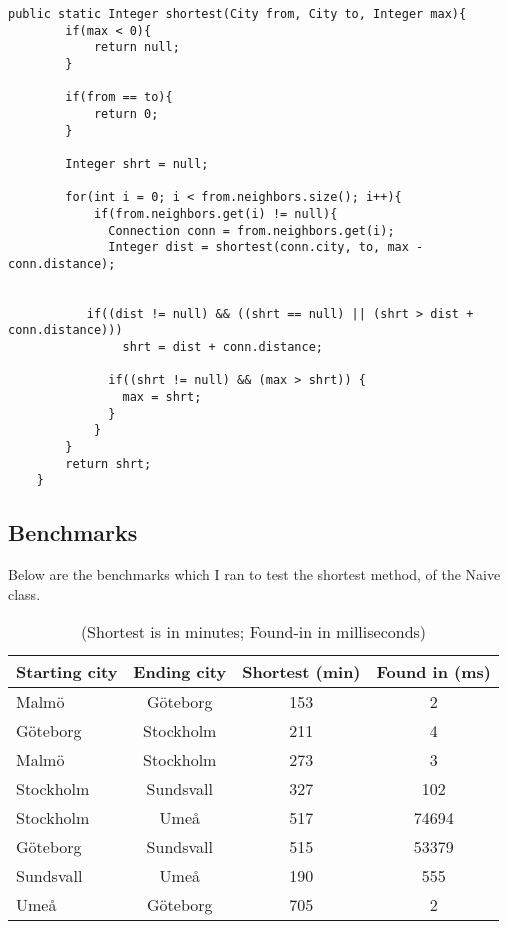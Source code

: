 \documentclass[a4paper,11pt]{article}
\begin{document}
\begin{verbatim}
public static Integer shortest(City from, City to, Integer max){
        if(max < 0){
            return null;
        }
        
        if(from == to){
            return 0;
        }

        Integer shrt = null;

        for(int i = 0; i < from.neighbors.size(); i++){
            if(from.neighbors.get(i) != null){
              Connection conn = from.neighbors.get(i);
              Integer dist = shortest(conn.city, to, max - conn.distance);
              

           if((dist != null) && ((shrt == null) || (shrt > dist + conn.distance)))
                shrt = dist + conn.distance;
               
              if((shrt != null) && (max > shrt)) {
                max = shrt;
              }
            }
        }
        return shrt;
    }
\end{verbatim}

\subsection*{Benchmarks}
Below are the benchmarks which I ran to test the shortest method, of the Naive class.

\begin{table}[h]
\begin{center}
\begin{tabular}{l|c|c|c}
\textbf{Starting city} & \textbf{Ending city} & \textbf{Shortest (min)} & \textbf{Found in (ms)}\\
\hline
  Malmö      &  Göteborg     &  153     &  2\\
  Göteborg      &  Stockholm     &  211     &  4\\
  Malmö      &  Stockholm     &  273     &  3\\
  Stockholm      &  Sundsvall     &  327     &  102\\
  Stockholm      &  Umeå     &  517     &  74694\\
  Göteborg      &  Sundsvall     &  515     &  53379\\
  Sundsvall      &  Umeå     &  190     &  555\\
  Umeå      &  Göteborg     &  705     &  2\\
\end{tabular}
\caption{(Shortest is in minutes; Found-in in milliseconds)}
\label{tab:table1}
\end{center}
\end{table}
\end{document}
